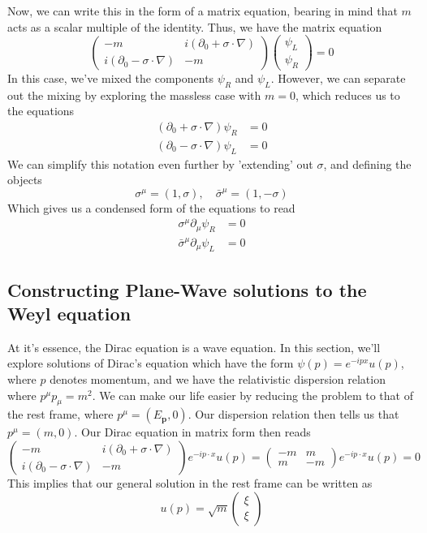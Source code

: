 \documentclass[11pt, oneside]{article}   	%
\theoremstyle{newline}
\theoremstyle{newline}
\theoremstyle{newline}
\theoremstyle{newline}
\theoremstyle{newline}
\begin{document}
Now, we can write this in the form of a matrix equation, bearing in mind that $m$ acts as a scalar multiple of the identity. Thus, we have the matrix equation \[ 
\begin{pmatrix} 
-m & i (\partial_0 + \sigma \cdot \nabla ) \\
i(\partial_0 - \sigma \cdot \nabla) & -m 
\end{pmatrix} 
\begin{pmatrix} 
\psi_L \\ \psi_R \end{pmatrix} = 0 
\]
In this case, we've mixed the components $\psi_R$ and $\psi_L $. However, we can separate out the mixing by exploring the massless case with $m = 0$, which reduces us to the equations 
\begin{align*}  
( \partial_0 + \sigma \cdot \nabla ) \psi_R & = 0 \\ 
( \partial_0 - \sigma \cdot \nabla ) \psi_L & = 0 
\end{align*} 
We can simplify this notation even further by 'extending' out $\sigma$, and defining the objects 
\[ \sigma^\mu = (1, \sigma ), \quad \bar{ \sigma}^\mu = ( 1,  - \sigma ) \] 
Which gives us a condensed form of the equations to read \begin{align*}  
\sigma^\mu \partial_\mu \psi_R & = 0 \\
\bar{\sigma}^\mu \partial_\mu \psi_L & = 0 
\end{align*} 

\subsection{Constructing Plane-Wave solutions to the Weyl equation} 
At it's essence, the Dirac equation is a wave equation. In this section, we'll explore solutions of Dirac's equation which have the form $\psi(p )  = e^{ - i p x } u ( p ) $, where $p$ denotes momentum, and we have the relativistic dispersion relation where $p^\mu p_\mu = m^2 $. We can make our life easier by reducing the problem to that of the rest frame, where $p^\mu  = (E_\mathbf{p} , 0 ) $. Our dispersion relation then tells us that $p^\mu = (m,  0 )$. Our Dirac equation in matrix form then reads \[ 
\begin{pmatrix}  - m & i ( \partial_0  + \sigma \cdot \nabla ) \\ 
i ( \partial_0  - \sigma \cdot \nabla ) & -m 
\end{pmatrix} e^{ - i p \cdot x } u(  p )  = \begin{pmatrix} -m & m \\ m & -m \end{pmatrix} e^{  - i p \cdot x } u(p)  = 0 
\] 
This implies that our general solution in the rest frame can be written as \[ u(p)  = \sqrt{m} \begin{pmatrix} \xi \\ \xi \end{pmatrix} \] 
\end{document}
